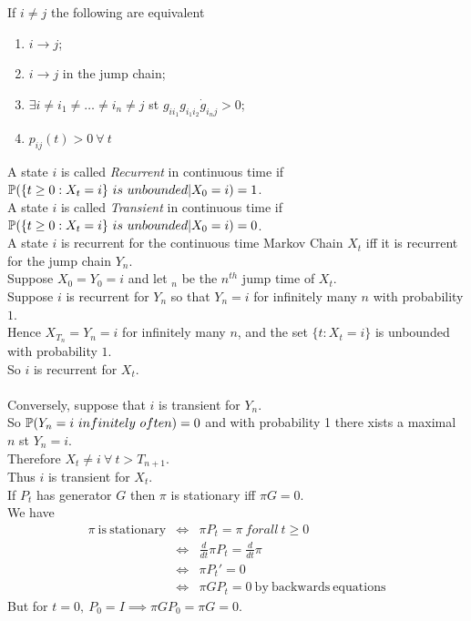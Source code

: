 \documentclass[11pt,a4paper]{article}
\begin{document}
If $i\neq j$ the following are equivalent
\begin{enumerate}[label=\roman*)]
	\item $i\to j$;
	\item $i\to j$ in the jump chain;
	\item $\exists i\neq i_1\neq\dots\neq i_n\neq j$ st $g_{ii_1}g_{i_1i_2}\dot g_{i_nj}>0$;
	\item $p_{ij}(t)>0\ \forall\ t$
\end{enumerate}

A state $i$ is called \textit{Recurrent} in continuous time if $\prob(\{t\geq0:X_t=i\}\ is\ unbounded|X_0=i)=1$.\\

A state $i$ is called \textit{Transient} in continuous time if $\prob(\{t\geq0:X_t=i\}\ is\ unbounded|X_0=i)=0$.\\

\theorem{}
A state $i$ is recurrent for the continuous time Markov Chain $X_t$ iff it is recurrent for the jump chain $Y_n$.\\

Suppose $X_0=Y_0=i$ and let $_n$ be the $n^{th}$ jump time of $X_t$.\\
Suppose $i$ is recurrent for $Y_n$ so that $Y_n=i$ for infinitely many $n$ with probability $1$.\\
Hence $X_{T_n}=Y_n=i$ for infinitely many $n$, and the set $\{t:X_t=i\}$ is unbounded with probability $1$.\\
So $i$ is recurrent for $X_t$.\\
\\
Conversely, suppose that $i$ is transient for $Y_n$.\\
So $\mathbb{P}(Y_n=i\ infinitely\ often)=0$ and with probability 1 there xists a maximal $n$ st $Y_n=i$.\\
Therefore $X_t\neq i\ \forall\ t>T_{n+1}$.\\
Thus $i$ is transient for $X_t$.\\

If $P_t$ has generator $G$ then $\pi$ is stationary iff $\pi G=0$.\\

We have
\[\begin{array}{rcl}
\pi\mathrm{\ is\ stationary}&\Leftrightarrow&\pi P_t=\pi\ forall\ t\geq0\\
&\Leftrightarrow&\frac{d}{dt}\pi P_t=\frac{d}{dt}\pi\\
&\Leftrightarrow&\pi P_t'=0\\
&\Leftrightarrow&\pi GP_t=0\mathrm{\ by\ backwards\ equations}
\end{array}\]
But for $t=0,\ P_0=I\implies \pi GP_0=\pi G=0$.\\
\end{document}
